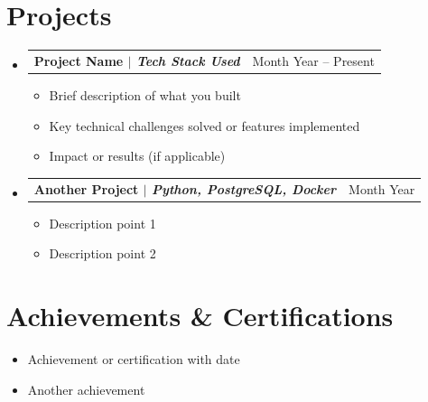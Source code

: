 \documentclass[11pt,a4paper]{article}
\makeatletter
\newcommand{\resumeProjectHeading}[2]{
  \item
    \begin{tabular*}{\textwidth}{l@{\extracolsep{\fill}}r}
      \textbf{#1} & #2 \\
    \end{tabular*}
}
\makeatother
\begin{document}
\section{Projects}
\begin{itemize}[leftmargin=0in, label={}]
    \resumeProjectHeading
      {Project Name $|$ \textit{Tech Stack Used}}{Month Year -- Present}
      \begin{itemize}[leftmargin=0.15in]
        \item Brief description of what you built
        \item Key technical challenges solved or features implemented
        \item Impact or results (if applicable)
      \end{itemize}
      
    \resumeProjectHeading
      {Another Project $|$ \textit{Python, PostgreSQL, Docker}}{Month Year}
      \begin{itemize}[leftmargin=0.15in]
        \item Description point 1
        \item Description point 2
      \end{itemize}
      
\end{itemize}

\section{Achievements \& Certifications}
\begin{itemize}[leftmargin=0.15in]
    \item Achievement or certification with date
    \item Another achievement
\end{itemize}
\end{document}
